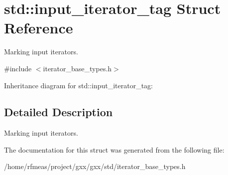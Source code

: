 \hypertarget{structstd_1_1input__iterator__tag}{}\section{std\+:\+:input\+\_\+iterator\+\_\+tag Struct Reference}
\label{structstd_1_1input__iterator__tag}


Marking input iterators.  




{\ttfamily \#include $<$iterator\+\_\+base\+\_\+types.\+h$>$}



Inheritance diagram for std\+:\+:input\+\_\+iterator\+\_\+tag\+:


\subsection{Detailed Description}
Marking input iterators. 

The documentation for this struct was generated from the following file\+:\begin{DoxyCompactItemize}
\item 
/home/rfmeas/project/gxx/gxx/std/iterator\+\_\+base\+\_\+types.\+h\end{DoxyCompactItemize}
